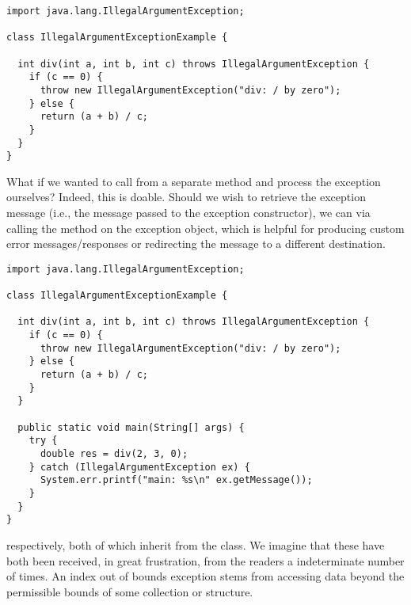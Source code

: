 \begin{lstlisting}[language=MyJava]
import java.lang.IllegalArgumentException;

class IllegalArgumentExceptionExample {
  
  int div(int a, int b, int c) throws IllegalArgumentException {
    if (c == 0) { 
      throw new IllegalArgumentException("div: / by zero"); 
    } else { 
      return (a + b) / c; 
    }
  }
}
\end{lstlisting}

What if we wanted to call  from a separate method and process the exception ourselves? 
Indeed, this is doable. 
Should we wish to retrieve the exception message (i.e., the message passed to the exception constructor), we can via calling the  method on the exception object, which is helpful for producing custom error messages/responses or redirecting the message to a different destination.

\begin{lstlisting}[language=MyJava]
import java.lang.IllegalArgumentException;

class IllegalArgumentExceptionExample {
  
  int div(int a, int b, int c) throws IllegalArgumentException {
    if (c == 0) { 
      throw new IllegalArgumentException("div: / by zero"); 
    } else { 
      return (a + b) / c; 
    }
  }

  public static void main(String[] args) {
    try {
      double res = div(2, 3, 0);
    } catch (IllegalArgumentException ex) {
      System.err.printf("main: %s\n" ex.getMessage());
    }
  }
}
\end{lstlisting}

 respectively, both of which inherit from the  class. 
We imagine that these have both been received, in great frustration, from the readers a indeterminate number of times. 
An index out of bounds exception stems from accessing data beyond the permissible bounds of some collection or structure.

